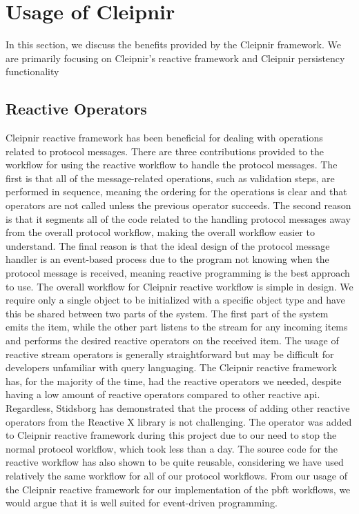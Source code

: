 \section{Usage of Cleipnir}
In this section, we discuss the benefits provided by the Cleipnir framework. We are primarily focusing on Cleipnir's reactive framework and Cleipnir persistency functionality
\subsection{Reactive Operators}
Cleipnir reactive framework has been beneficial for dealing with operations related to protocol messages. There are three contributions provided to the workflow for using the reactive workflow to handle the protocol messages. The first is that all of the message-related operations, such as validation steps, are performed in sequence, meaning the ordering for the operations is clear and that operators are not called unless the previous operator succeeds. The second reason is that it segments all of the code related to the handling protocol messages away from the overall protocol workflow, making the overall workflow easier to understand. The final reason is that the ideal design of the protocol message handler is an event-based process due to the program not knowing when the protocol message is received, meaning reactive programming is the best approach to use. 
The overall workflow for Cleipnir reactive workflow is simple in design. We require only a single  object to be initialized with a specific object type and have this be shared between two parts of the system. The first part of the system emits the item, while the other part listens to the stream for any incoming items and performs the desired reactive operators on the received item. The usage of reactive stream operators is generally straightforward but may be difficult for developers unfamiliar with query languaging. The Cleipnir reactive framework has, for the majority of the time, had the reactive operators we needed, despite having a low amount of reactive operators compared to other reactive \ac{api}. Regardless, Stidsborg has demonstrated that the process of adding other reactive operators from the Reactive X library is not challenging. The  operator was added to Cleipnir reactive framework during this project due to our need to stop the normal protocol workflow, which took less than a day. The source code for the reactive workflow has also shown to be quite reusable, considering we have used relatively the same workflow for all of our protocol workflows. From our usage of the Cleipnir reactive framework for our implementation of the \ac{pbft} workflows, we would argue that it is well suited for event-driven programming. 

